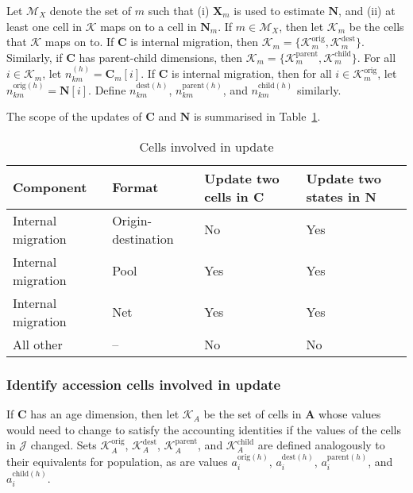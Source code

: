 \documentclass{article}
\begin{document}
Let $\mathcal{M}_X$ denote the set of $m$ such that (i) $\bm{X}_m$ is used to estimate $\bm{N}$, and (ii) at least one cell in $\mathcal{K}$ maps on to a cell in $\bm{N}_m$.  If $m \in \mathcal{M}_X$, then let $\mathcal{K}_m$ be the cells that $\mathcal{K}$ maps on to.  If $\bm{C}$ is internal migration, then $\mathcal{K}_m = \{\mathcal{K}_m^{\text{orig}}, \mathcal{K}_m^{\text{dest}}\}$.  Similarly, if $\bm{C}$ has parent-child dimensions, then $\mathcal{K}_m = \{\mathcal{K}_m^{\text{parent}}, \mathcal{K}_m^{\text{child}}\}$. For all $i \in \mathcal{K}_m$, let $n_{km}^{(h)} = \bm{C}_m[i]$.    If $\bm{C}$ is internal migration, then for all $i \in \mathcal{K}_m^{\text{orig}}$, let $n_{km}^{\text{orig}(h)} = \bm{N}[i]$.  Define $n_{km}^{\text{dest}(h)}$, $n_{km}^{\text{parent}(h)}$, and $n_{km}^{\text{child}(h)}$ similarly.

The scope of the updates of $\bm{C}$ and $\bm{N}$ is summarised in Table~\ref{tab:cells_update}.

\begin{table}
  \centering
  \caption{Cells involved in update}
  \begin{tabular}{p{3.4cm}p{3.4cm}p{1.8cm}p{1.8cm}}
    \hline
    Component & Format & Update two cells in $\bm{C}$ & Update two states in $\bm{N}$ \\    
    \hline
    Internal migration & Origin-destination & No & Yes \\
    Internal migration & Pool & Yes & Yes \\
    Internal migration & Net & Yes & Yes \\
    All other & -- & No & No \\
    \hline
  \end{tabular}
  \label{tab:cells_update}
\end{table}


\subsubsection{Identify accession cells involved in update}

If $\bm{C}$ has an age dimension, then let $\mathcal{K}_A$ be the set of cells in $\bm{A}$ whose values would need to change to satisfy the accounting identities if the values of the cells in $\mathcal{J}$ changed.  Sets $\mathcal{K}_A^{\text{orig}}$, $\mathcal{K}_A^{\text{dest}}$, $\mathcal{K}_A^{\text{parent}}$, and $\mathcal{K}_A^{\text{child}}$ are defined analogously to their equivalents for population, as are values $a_i^{\text{orig}(h)}$, $a_i^{\text{dest}(h)}$, $a_i^{\text{parent}(h)}$, and $a_i^{\text{child}(h)}$.
\end{document}
